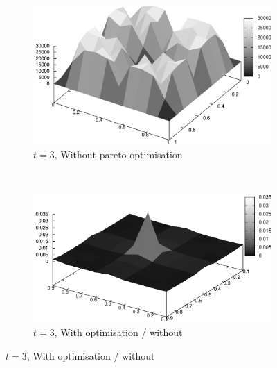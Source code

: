 \documentclass{article}
\begin{document}
\begin{figure}
		\begin{subfigure}[b]{0.45\textwidth}
			\centering
			\includegraphics[width=\textwidth]{images/r3_nopareto}
			\caption{$t=3$, Without pareto-optimisation}
			\label{fig:r3_nopareto}
		\end{subfigure}
		~
		\begin{subfigure}[b]{0.45\textwidth}
			\centering
			\includegraphics[width=\textwidth]{images/r3_divided}
			\caption{$t=3$, With optimisation / without}
			\label{fig:r3_divided}
		\end{subfigure}


\end{figure}
\end{document}
